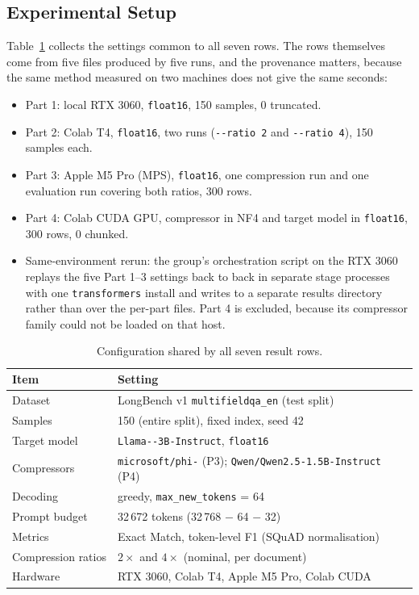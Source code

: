 ﻿\documentclass[10pt,a4paper,twocolumn]{article}
\newcommand{\Llama}{\texttt{Llama-\allowbreak 3.2-\allowbreak 3B-\allowbreak Instruct}}
\newcommand{\PhiTwo}{\texttt{microsoft/\allowbreak phi-\allowbreak 2}}
\newcommand{\QwenOne}{\texttt{Qwen/}\allowbreak\texttt{Qwen2.5-\allowbreak 1.5B-\allowbreak Instruct}}
\newcommand{\MFQA}{\texttt{multifieldqa\_\allowbreak en}}
\begin{document}
\subsection{Experimental Setup}
\label{sec:setup}

Table~\ref{tab:config} collects the settings common to all seven rows. The rows
themselves come from five files produced by five runs, and the provenance matters,
because the same method measured on two machines does not give the same seconds:

\begin{itemize}
  \item Part 1: local RTX 3060, \texttt{float16}, 150 samples, 0 truncated.
  \item Part 2: Colab T4, \texttt{float16}, two runs (\texttt{-{}-ratio 2} and
  \texttt{-{}-ratio 4}), 150 samples each.
  \item Part 3: Apple M5 Pro (MPS), \texttt{float16}, one compression run and one
  evaluation run covering both ratios, 300 rows.
  \item Part 4: Colab CUDA GPU, compressor in NF4 and target model in
  \texttt{float16}, 300 rows, 0 chunked.
  \item Same-environment rerun: the group's orchestration script on the RTX 3060
  replays the five Part 1--3 settings back to back in separate stage processes with one
  \texttt{transformers} install and writes to a separate results directory
  rather than over the per-part files. Part 4 is excluded, because its
  compressor family could not be loaded on that host.
\end{itemize}

\begin{table}[t]
\centering
\footnotesize
\begin{tabularx}{\columnwidth}{@{}lX@{}}
\toprule
Item & Setting \\
\midrule
Dataset & LongBench v1 \MFQA{} (test split) \\
Samples & 150 (entire split), fixed index, seed 42 \\
Target model & \Llama{}, \texttt{float16} \\
Compressors & \PhiTwo{} (P3); \QwenOne{} (P4) \\
Decoding & greedy, \texttt{max\_new\_tokens} = 64 \\
Prompt budget & 32\,672 tokens (32\,768 $-$ 64 $-$ 32) \\
Metrics & Exact Match, token-level F1 (SQuAD normalisation) \\
Compression ratios & $2\times$ and $4\times$ (nominal, per document) \\
Hardware & RTX 3060, Colab T4, Apple M5 Pro, Colab CUDA \\
\bottomrule
\end{tabularx}
\caption{Configuration shared by all seven result rows.}
\label{tab:config}
\end{table}
\end{document}
